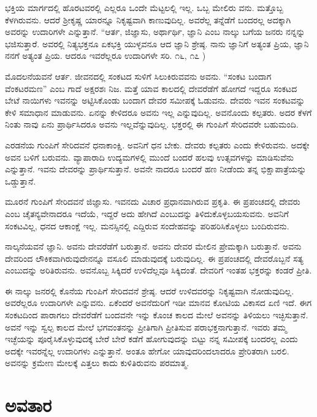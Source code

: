 ಭಕ್ತಿಯ ಮಾರ್ಗದಲ್ಲಿ ಹೊರಟವರಲ್ಲಿ ಎಲ್ಲರೂ ಒಂದೇ ಮೆಟ್ಟಲಲ್ಲಿ ಇಲ್ಲ. ಒಬ್ಬ ಮೇಲಿರು ವನು. ಮತ್ತೊಬ್ಬ ಕೆಳಗಿರುವನು. ಆದರೆ ಶ್ರೀಕೃಷ್ಣ ಯಾರನ್ನೂ ನಿಕೃಷ್ಟವಾಗಿ ಕಾಣುವುದಿಲ್ಲ. ಅವರೆಲ್ಲ ತನ್ನೆಡೆಗೆ ಬಂದರಲ್ಲ ಅದಕ್ಕಾಗಿ ಅವರನ್ನು ಉದಾರಿಗಳೇ ಎನ್ನುತ್ತಾನೆ. “ಆರ್ತ, ಜಿಜ್ಞಾಸು, ಅರ್ಥಾರ್ಥಿ, ಜ್ಞಾನಿ ಎಂಬ ನಾಲ್ಕು ಬಗೆಯ ಜನರು ನನ್ನನ್ನು ಭಜಿಸುತ್ತಾರೆ. ಅವರಲ್ಲಿ ನಿತ್ಯಭಕ್ತನೂ ಏಕಭಕ್ತಿ ಯುಳ್ಳವನೂ ಆದ ಜ್ಞಾನಿ ಶ್ರೇಷ್ಠ. ನಾನು ಜ್ಞಾನಿಗೆ ಅತ್ಯಂತ ಪ್ರಿಯ, ಜ್ಞಾನಿ ನನಗೆ ಅತ್ಯಂತ ಪ್ರಿಯ. ಆದರೂ ಇವರೆಲ್ಲರೂ ಉದಾರಿಗಳೇ ಸರಿ. ೧೬, ೧೭ )

ಮೊದಲನೆಯವನೆ ಆರ್ತ. ಜೀವನದಲ್ಲಿ ಸಂಕಟದ ಸುಳಿಗೆ ಸಿಲುಕಿರುವವನು ಅವನು. “ಸಂಕಟ ಬಂದಾಗ ವೆಂಕಟರಮಣ” ಎಂಬ ಗಾದೆ ಅಕ್ಷರಶಃ ನಿಜ. ಮತ್ತೆ ಯಾವ ಕಾಲದಲ್ಲಿ ದೇವರೆಡೆಗೆ ಹೋಗದೆ ಇದ್ದರೂ ಸಂಕಟದ ಬೇಟೆ ನಾಯಿಗಳು ಇವನನ್ನು ಅಟ್ಟಿಸಿಕೊಂಡು ಬಂದಾಗ ದೇವರ ಸಮೀಪಕ್ಕೆ ಓಡುವನು. ದೇವರು ಇವನ ಸಂಕಟವನ್ನು ಕೇಳಿ ಸಮಾಧಾನ ಮಾಡುವನು. ಏನನ್ನು ಕೇಳಿದರೂ ಅವನು ಇಲ್ಲ ಎನ್ನುವುದಿಲ್ಲ. ಅವನೊಂದು ಕಲ್ಪತರು. ಅದರ ಕೆಳಗೆ ನಿಂತು ನಾವು ಏನು ಪ್ರಾರ್ಥಿಸಿದರೂ ಅವನು ಇಲ್ಲವೆನ್ನುವುದಿಲ್ಲ. ಭಕ್ತರಲ್ಲಿ ಈ ಗುಂಪಿಗೆ ಸೇರಿದವರೇ ಬಹುಮಂದಿ.

ಎರಡನೆಯ ಗುಂಪಿಗೆ ಸೇರಿದವನೆ ಧನಾಕಾಂಕ್ಷಿ. ಅವನಿಗೆ ಧನ ಬೇಕು. ದೇವರು ಕಲ್ಪತರು ಎಂದು ಕೇಳಿರುವನು. ಅದಕ್ಕೇ ಅವನ ಬಳಿಗೆ ಬರುವನು. ವ್ಯಾಪಾರಾದಿ ಉದ್ಯಮಗಳಲ್ಲಿ ಮುಂದೆ ಬಂದರೆ ಹಲವು ಉತ್ಸವಗಳನ್ನು ಮಾಡಿಸುವೆನು ಎನ್ನುತ್ತಾನೆ. ಇವನು ದೇವರನ್ನು ಪ್ರಾರ್ಥಿಸುತ್ತಾನೆ. ಅವನೇ ನಾದರೂ ಬಂದರೆ ಹಣ ನೀಡೆಂದು ತನ್ನ ಭಿಕ್ಷಾಪಾತ್ರೆಯನ್ನು ಒಡ್ಡುತ್ತಾನೆ.

ಮೂರನೆ ಗುಂಪಿಗೆ ಸೇರಿದವನೆ ಜಿಜ್ಞಾಸು. ಇವನದು ವಿಚಾರ ಪ್ರಧಾನವಾಗಿರುವ ಪ್ರಕೃತಿ. ಈ ಪ್ರಪಂಚದಲ್ಲಿ ದೇವರು ಎಂಬ ಚೈತನ್ಯವೇನಾದರೂ ಇದೆಯೆ, ಇದ್ದರೆ ಅದು ಹೇಗಿದೆ ಎಂಬುದನ್ನು ತಿಳಿದುಕೊಳ್ಳಬಯಸುವನು. ಅವನಿಗೆ ಸಂಕಟವಿಲ್ಲ, ಧನದ ಆಕಾಂಕ್ಷೆ ಇಲ್ಲ. ಮನಸ್ಸಿನಲ್ಲಿ ಎದ್ದಿರುವ ಸಂದೇಹವನ್ನು ಪರಿಹರಿಸಿಕೊಳ್ಳಲು ಬಂದಿರುವನು.

ನಾಲ್ಕನೆಯವನೆ ಜ್ಞಾನಿ. ಅವನು ದೇವರೆಡೆಗೆ ಬರುತ್ತಾನೆ. ಅವನು ದೇವರ ಮೇಲಿನ ಪ್ರೇಮಕ್ಕಾಗಿ ಬರುತ್ತಾನೆ. ಅವನು ದೇವರಿಂದ ಲೌಕಿಕವಾಗಿರುವುದೇನನ್ನೂ ವಸೂಲಿ ಮಾಡುವುದಕ್ಕೆ ಬರುವುದಿಲ್ಲ. ಈ ಪ್ರಪಂಚದಲ್ಲಿ ದೇವರೊಬ್ಬನೆ ಸತ್ಯ ಎಂಬುದನ್ನು ಅರಿತಿರುವನು. ಅವನೊಬ್ಬ ಸಿಕ್ಕಿದರೆ ಉಳಿದೆಲ್ಲವೂ ಸಿಕ್ಕಿದಂತೆ. ದೇವರಿಗೆ ಇಂತಹ ಭಕ್ತರನ್ನು ಕಂಡರೆ ಪ್ರೀತಿ.

ಈ ನಾಲ್ಕು ಜನರಲ್ಲಿ ಕೊನೆಯ ಗುಂಪಿಗೆ ಸೇರಿದವನೆ ಶ್ರೇಷ್ಠ. ಆದರೆ ಉಳಿದವರನ್ನು ನಿಕೃಷ್ಟವಾಗಿ ನೋಡುವುದಿಲ್ಲ. ಅವರೆಲ್ಲರೂ ಉದಾರಿಗಳೇ ಎನ್ನುವನು. ಏಕೆಂದರೆ ಅವನೆದುರಿಗೆ ಇಡೀ ಮಾನವ ಕೋಟಿಯ ವಿಕಾಸದ ಏಣಿ ಇದೆ. ಈಗ ಸಂಕಟದಿಂದ ಪಾರಾಗಲು ದೇವರೆಡೆಗೆ ಬಂದವನೇ ಇನ್ನು ಕೊಂಚ ಕಾಲದ ಮೇಲೆ ಅವನನ್ನು ತಿಳಿಯಲು ಇಚ್ಛಿಸುತ್ತಾನೆ. ಅವನೆ ಇನ್ನು ಸ್ವಲ್ಪ ಕಾಲದ ಮೇಲೆ ಭಗವಂತನನ್ನು ಪ್ರೀತಿಗಾಗಿ ಪ್ರೀತಿಸುವ ಪರಾಭಕ್ತನಾಗುತ್ತಾನೆ. ಇವರು ತಮ್ಮ ಇಚ್ಛೆಯನ್ನು ಪೂರೈಸಿಕೊಳ್ಳುವುದಕ್ಕೆ ಬೇರೆ ಬೇರೆ ಕಡೆಗೆ ಹೋಗುವುದನ್ನು ಬಿಟ್ಟು ನನ್ನ ಸಮೀಪಕ್ಕೆ ಬಂದರಲ್ಲ ಎಂದು ಅದಕ್ಕೇ ಇವರನ್ನೆಲ್ಲ ಉದಾರಿಗಳು ಎನ್ನುತ್ತಾನೆ. ಅಂತೂ ಹೇಗೋ ಯಾವುದರಿಂದಲಾದರೂ ಪ್ರೇರಿತರಾಗಿ ಬರಲಿ. ಅವನನ್ನು ಕ್ರಮೇಣ ಮೇಲಕ್ಕೆ ಎತ್ತಲು ಕಾದು ಕುಳಿತಿರುವನು ಪರಮಾತ್ಮ.


\section*{ಅವತಾರ}

